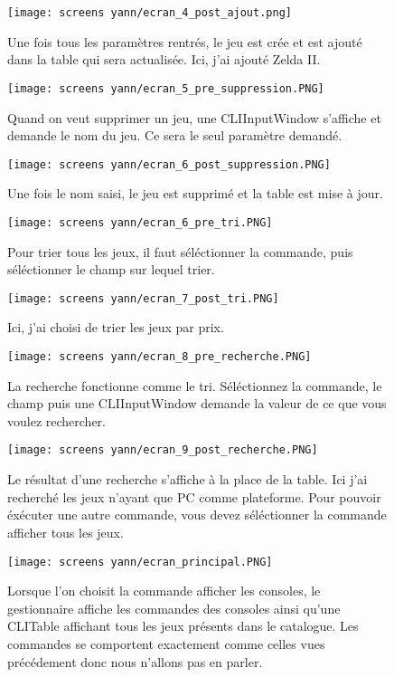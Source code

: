 \documentclass[11pt]{article}
\begin{document}
\newpage
    \begin{figure}[]
        \centering
        \texttt{[image: screens yann/ecran\_4\_post\_ajout.png]}
        \caption{Une fois tous les paramètres rentrés, le jeu est crée et est ajouté dans la table qui sera actualisée. Ici, j'ai ajouté Zelda II.}
        
        \vspace{\baselineskip}
        
        \centering
        \texttt{[image: screens yann/ecran\_5\_pre\_suppression.PNG]}
        \caption{Quand on veut supprimer un jeu, une CLIInputWindow s'affiche et demande le nom du jeu. Ce sera le seul paramètre demandé.}
        
        \vspace{\baselineskip}
        
        \centering
        \texttt{[image: screens yann/ecran\_6\_post\_suppression.PNG]}
        \caption{Une fois le nom saisi, le jeu est supprimé et la table est mise à jour.}
    
        \vspace{\baselineskip}
        
        \centering
        \texttt{[image: screens yann/ecran\_6\_pre\_tri.PNG]}
        \caption{Pour trier tous les jeux, il faut séléctionner la commande, puis séléctionner le champ sur lequel trier.}
    \end{figure}
    
\newpage
    \begin{figure}[]
        \centering
        \texttt{[image: screens yann/ecran\_7\_post\_tri.PNG]}
        \caption{Ici, j'ai choisi de trier les jeux par prix.}
        
        \vspace{\baselineskip}
        
        \centering
        \texttt{[image: screens yann/ecran\_8\_pre\_recherche.PNG]}
        \caption{La recherche fonctionne comme le tri. Séléctionnez la commande, le champ puis une CLIInputWindow demande la valeur de ce que vous voulez rechercher.}
        
        \vspace{\baselineskip}
        
        \centering
        \texttt{[image: screens yann/ecran\_9\_post\_recherche.PNG]}
        \caption{Le résultat d'une recherche s'affiche à la place de la table. Ici j'ai recherché les jeux n'ayant que PC comme plateforme. Pour pouvoir éxécuter une autre commande, vous devez séléctionner la commande afficher tous les jeux.}
        
        \vspace{\baselineskip}
        
        \centering
        \texttt{[image: screens yann/ecran\_principal.PNG]}
        \caption{Lorsque l'on choisit la commande afficher les consoles, le gestionnaire affiche les commandes des consoles ainsi qu'une CLITable affichant tous les jeux présents dans le catalogue. Les commandes se comportent exactement comme celles vues précédement donc nous n'allons pas en parler.}
    \end{figure}
    
\end{document}
